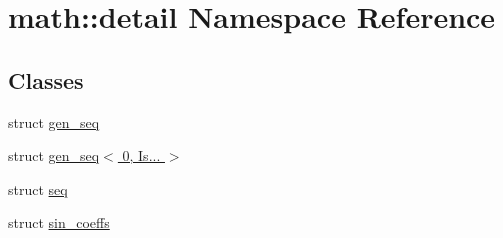 \hypertarget{namespacemath_1_1detail}{}\section{math\+:\+:detail Namespace Reference}
\label{namespacemath_1_1detail}
\subsection*{Classes}
\begin{DoxyCompactItemize}
\item 
struct \hyperlink{structmath_1_1detail_1_1gen__seq}{gen\+\_\+seq}
\item 
struct \hyperlink{structmath_1_1detail_1_1gen__seq_3_010_00_01_is_8_8_8_01_4}{gen\+\_\+seq$<$ 0, Is... $>$}
\item 
struct \hyperlink{structmath_1_1detail_1_1seq}{seq}
\item 
struct \hyperlink{structmath_1_1detail_1_1sin__coeffs}{sin\+\_\+coeffs}
\end{DoxyCompactItemize}
